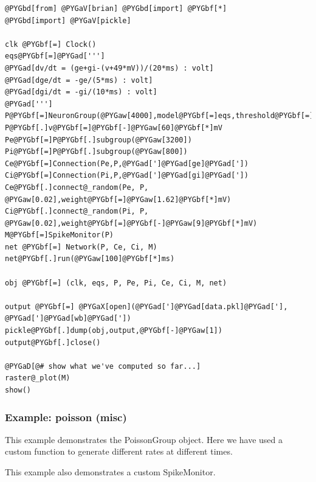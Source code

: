 \documentclass[letterpaper,10pt,english]{manual}
\begin{document}
\begin{Verbatim}[commandchars=@\[\]]
@PYGbd[from] @PYGaV[brian] @PYGbd[import] @PYGbf[*]
@PYGbd[import] @PYGaV[pickle]

clk @PYGbf[=] Clock()
eqs@PYGbf[=]@PYGad[''']
@PYGad[dv/dt = (ge+gi-(v+49*mV))/(20*ms) : volt]
@PYGad[dge/dt = -ge/(5*ms) : volt]
@PYGad[dgi/dt = -gi/(10*ms) : volt]
@PYGad[''']
P@PYGbf[=]NeuronGroup(@PYGaw[4000],model@PYGbf[=]eqs,threshold@PYGbf[=]@PYGbf[-]@PYGaw[50]@PYGbf[*]mV,reset@PYGbf[=]@PYGbf[-]@PYGaw[60]@PYGbf[*]mV)
P@PYGbf[.]v@PYGbf[=]@PYGbf[-]@PYGaw[60]@PYGbf[*]mV
Pe@PYGbf[=]P@PYGbf[.]subgroup(@PYGaw[3200])
Pi@PYGbf[=]P@PYGbf[.]subgroup(@PYGaw[800])
Ce@PYGbf[=]Connection(Pe,P,@PYGad[']@PYGad[ge]@PYGad['])
Ci@PYGbf[=]Connection(Pi,P,@PYGad[']@PYGad[gi]@PYGad['])
Ce@PYGbf[.]connect@_random(Pe, P, @PYGaw[0.02],weight@PYGbf[=]@PYGaw[1.62]@PYGbf[*]mV)
Ci@PYGbf[.]connect@_random(Pi, P, @PYGaw[0.02],weight@PYGbf[=]@PYGbf[-]@PYGaw[9]@PYGbf[*]mV)
M@PYGbf[=]SpikeMonitor(P)
net @PYGbf[=] Network(P, Ce, Ci, M)
net@PYGbf[.]run(@PYGaw[100]@PYGbf[*]ms)

obj @PYGbf[=] (clk, eqs, P, Pe, Pi, Ce, Ci, M, net)

output @PYGbf[=] @PYGaX[open](@PYGad[']@PYGad[data.pkl]@PYGad['], @PYGad[']@PYGad[wb]@PYGad['])
pickle@PYGbf[.]dump(obj,output,@PYGbf[-]@PYGaw[1])
output@PYGbf[.]close()

@PYGaD[@# show what we've computed so far...]
raster@_plot(M)
show()
\end{Verbatim}

\resetcurrentobjects
\hypertarget{--doc-examples-misc_poisson}{}

\hypertarget{index-78}{}\subsubsection{Example: poisson (misc)}

This example demonstrates the PoissonGroup object. Here we have
used a custom function to generate different rates at different
times.

This example also demonstrates a custom SpikeMonitor.
\end{document}
